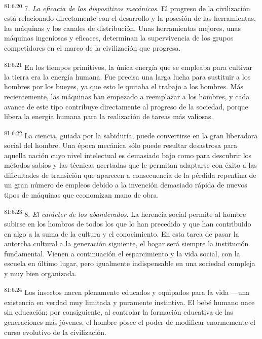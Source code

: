 \documentclass[twoside, 11pt]{book}
\begin{document}
\par
\textsuperscript{81:6.20} 7. \textit{La eficacia de los dispositivos mecánicos}. El progreso de la civilización está relacionado directamente con el desarrollo y la posesión de las herramientas, las máquinas y los canales de distribución. Unas herramientas mejores, unas máquinas ingeniosas y eficaces, determinan la supervivencia de los grupos competidores en el marco de la civilización que progresa.

\par
\textsuperscript{81:6.21} En los tiempos primitivos, la única energía que se empleaba para cultivar la tierra era la energía humana. Fue precisa una larga lucha para sustituir a los hombres por los bueyes, ya que esto le quitaba el trabajo a los hombres. Más recientemente, las máquinas han empezado a reemplazar a los hombres, y cada avance de este tipo contribuye directamente al progreso de la sociedad, porque libera la energía humana para la realización de tareas más valiosas.

\par
\textsuperscript{81:6.22} La ciencia, guiada por la sabiduría, puede convertirse en la gran liberadora social del hombre. Una época mecánica sólo puede resultar desastrosa para aquella nación cuyo nivel intelectual es demasiado bajo como para descubrir los métodos sabios y las técnicas acertadas que le permitan adaptarse con éxito a las dificultades de transición que aparecen a consecuencia de la pérdida repentina de un gran número de empleos debido a la invención demasiado rápida de nuevos tipos de máquinas que economizan mano de obra.

\par
\textsuperscript{81:6.23} 8. \textit{El carácter de los abanderados}. La herencia social permite al hombre subirse en los hombros de todos los que lo han precedido y que han contribuido en algo a la suma de la cultura y el conocimiento. En esta tarea de pasar la antorcha cultural a la generación siguiente, el hogar será siempre la institución fundamental. Vienen a continuación el esparcimiento y la vida social, con la escuela en último lugar, pero igualmente indispensable en una sociedad compleja y muy bien organizada.

\par
\textsuperscript{81:6.24} Los insectos nacen plenamente educados y equipados para la vida ---una existencia en verdad muy limitada y puramente instintiva. El bebé humano nace sin educación; por consiguiente, al controlar la formación educativa de las generaciones más jóvenes, el hombre posee el poder de modificar enormemente el curso evolutivo de la civilización.
\end{document}
